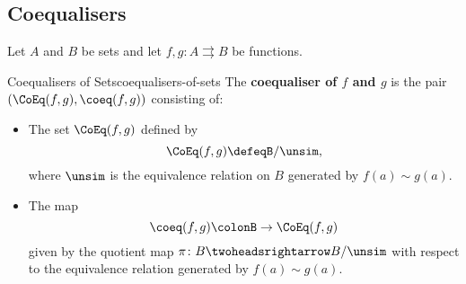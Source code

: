 \subsection{Coequalisers}\label{subsection-coequalisers}
Let $A$ and $B$ be sets and let $f,g\colon A\rightrightarrows B$ be functions.
\begin{definition}{Coequalisers of Sets}{coequalisers-of-sets}%
    The \textbf{coequaliser of $f$ and $g$} is the pair $(\CoEq(f,g),\coeq(f,g))$ consisting of:
    \begin{itemize}
        \item{}The set $\CoEq(f,g)$ defined by%
            \[
                \CoEq(f,g)%
                \defeq%
                B/\unsim,
            \]%
            where $\unsim$ is the equivalence relation on $B$ generated by $f(a)\sim g(a)$.
        \item{}The map
            \[
                \coeq(f,g)%
                \colon%
                B%
                \to%
                \CoEq(f,g)%
            \]%
            given by the quotient map $\pi\colon B\twoheadsrightarrow B/\unsim$ with respect to the equivalence relation generated by $f(a)\sim g(a)$.
    \end{itemize}
\end{definition}
